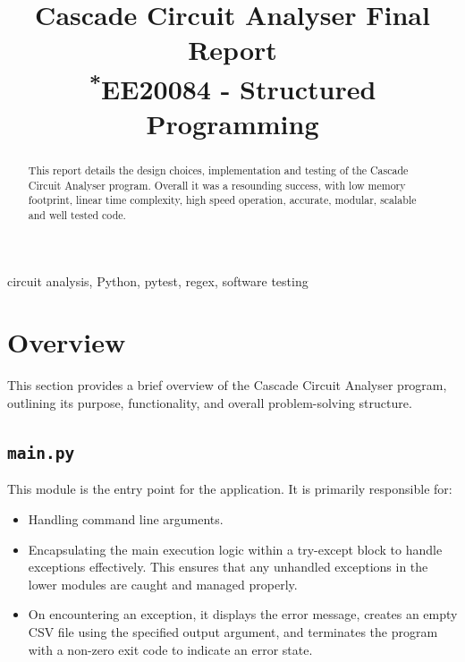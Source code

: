\documentclass[conference]{IEEEtran}
\begin{document}
\title{Cascade Circuit Analyser Final Report\\
{\footnotesize \textsuperscript{*}EE20084 - Structured Programming}
}

\author{
}
\maketitle

\begin{abstract}
      This report details the design choices, implementation and testing of the Cascade Circuit Analyser program.
      Overall it was a resounding success, with low memory footprint, linear time complexity, high speed operation, accurate, modular, scalable and well tested code.
\end{abstract}

\begin{IEEEkeywords}
      circuit analysis, Python, pytest, regex, software testing
\end{IEEEkeywords}

\tableofcontents

\section{Overview}
This section provides a brief overview of the Cascade Circuit Analyser program, outlining its purpose, functionality, and overall problem-solving structure.
\subsection{\textbf{\texttt{main.py}}}
This module is the entry point for the application. It is primarily responsible for:
\begin{itemize}
      \item Handling command line arguments.
      \item Encapsulating the main execution logic within a try-except block to handle exceptions effectively. This ensures that any unhandled exceptions in the lower modules are caught and managed properly.
      \item On encountering an exception, it displays the error message, creates an empty CSV file using the specified output argument, and terminates the program with a non-zero exit code to indicate an error state.
\end{itemize}
\end{document}
